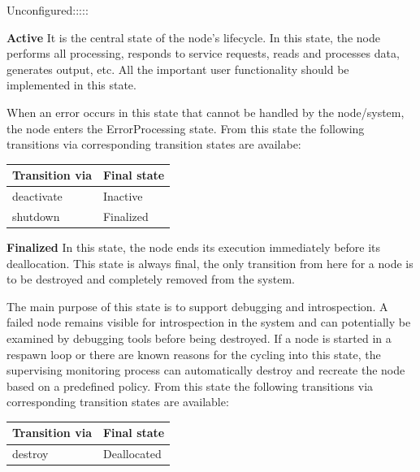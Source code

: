 \begin{labeling}{Unconfigured:::::}
		\item[\textbf{Active}] It is the central state of the node's lifecycle. In this state, the node performs all processing, responds to service requests, reads and processes data, generates output, etc. All the important user functionality should be implemented in this state.  

		When an error occurs in this state that cannot be handled by the node/system, the node enters the ErrorProcessing state. From this state the following transitions via corresponding transition states are availabe:
		\begin{table}[H]
			\centering
			\label{tab:Valid transitions}
			\begin{tabular}{|p{3cm}|p{3cm}|}
				\toprule
				Transition via & Final state\\
				\midrule
				 deactivate & Inactive  \\
				 shutdown & Finalized \\
				\bottomrule
			\end{tabular}
		\end{table}

		\item[\textbf{Finalized}] In this state, the node ends its execution immediately before its deallocation. This state is always final, the only transition from here for a node is to be destroyed and completely removed from the system.

		The main purpose of this state is to support debugging and introspection. A failed node remains visible for introspection in the system and can potentially be examined by debugging tools before being destroyed. If a node is started in a respawn loop or there are known reasons for the cycling into this state, the supervising monitoring process can automatically destroy and recreate the node based on a predefined policy. From this state the following transitions via corresponding transition states are available:
		\begin{table}[H]
			\centering
			\label{tab:Valid transitions}
			\begin{tabular}{|p{3cm}|p{3cm}|}
				\toprule
				Transition via & Final state\\
				\midrule
				 destroy & Deallocated  \\
				\bottomrule
			\end{tabular}
		\end{table}

	\end{labeling}

